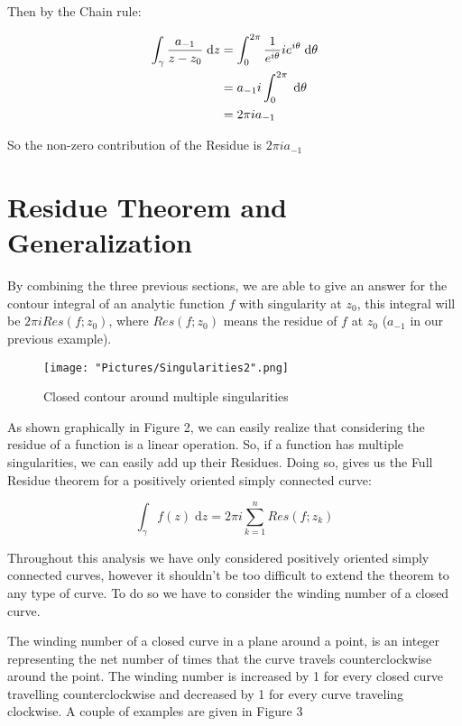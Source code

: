 \documentclass[12pt, letterpaper]{article}
\begin{document}
\noindent
Then by the Chain rule: 

\begin{align*}
\centering 
\int_{\gamma}^{} \frac{a_{-1}}{z - z_{0}} \;\mathrm{d}z &= \int_{0}^{2\pi} \frac{1}{e^{i\theta}} ie^{i\theta} \;\mathrm{d}\theta \\
&= a_{-1}i\int_{0}^{2\pi}\;\mathrm{d}\theta \\
&= 2\pi i a_{-1}
\end{align*}

\noindent
So the non-zero contribution of the Residue is \(2\pi i a_{-1}\)
\bigskip

\section*{Residue Theorem and Generalization}

\noindent
By combining the three previous sections, we are able to give an answer for the contour integral of an analytic function \(f\) with singularity at \(z_{0}\), this integral will be \(2\pi i Res(f;z_{0})\), where \(Res(f;z_{0})\) means the residue of \(f\) at \(z_{0}\) (\(a_{-1}\) in our previous example). 

\begin{figure}[h]
    \centering
    \texttt{[image: "Pictures/Singularities2".png]}
    \caption{Closed contour around multiple singularities}
    \label{fig:my_label3}
\end{figure}

\noindent
As shown graphically in Figure 2, we can easily realize that considering the residue of a function is a linear operation. So, if a function has multiple singularities, we can easily add up their Residues. Doing so, gives us the Full Residue theorem for a positively oriented simply connected curve:

\[\int_{\gamma}^{} f(z) \;\mathrm{d}z = 2\pi i \sum_{k=1}^{n} Res(f;z_{k}) \]

\noindent
Throughout this analysis we have only considered positively oriented simply connected curves, however it shouldn't be too difficult to extend the theorem to any type of curve. To do so we have to consider the winding number of a closed curve. 
\bigskip

\noindent
The winding number of a closed curve in a plane around a point, is an integer representing the net number of times that the curve travels counterclockwise around the point. The winding number is increased by 1 for every closed curve travelling counterclockwise and decreased by 1 for every curve traveling clockwise. A couple of examples are given in Figure 3
\end{document}
